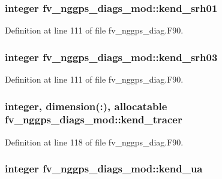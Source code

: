 \subsubsection[{kend\-\_\-srh01}]{\setlength{\rightskip}{0pt plus 5cm}integer fv\-\_\-nggps\-\_\-diags\-\_\-mod\-::kend\-\_\-srh01\hspace{0.3cm}{\ttfamily [private]}}\label{classfv__nggps__diags__mod_a78fcf7e103ecbbce2efb73cac3724aa1}


Definition at line 111 of file fv\-\_\-nggps\-\_\-diag.\-F90.

\subsubsection[{kend\-\_\-srh03}]{\setlength{\rightskip}{0pt plus 5cm}integer fv\-\_\-nggps\-\_\-diags\-\_\-mod\-::kend\-\_\-srh03\hspace{0.3cm}{\ttfamily [private]}}\label{classfv__nggps__diags__mod_a7ed4ac96d6427e52194a7b6068868d4f}


Definition at line 111 of file fv\-\_\-nggps\-\_\-diag.\-F90.

\subsubsection[{kend\-\_\-tracer}]{\setlength{\rightskip}{0pt plus 5cm}integer, dimension(\-:), allocatable fv\-\_\-nggps\-\_\-diags\-\_\-mod\-::kend\-\_\-tracer\hspace{0.3cm}{\ttfamily [private]}}\label{classfv__nggps__diags__mod_acf7563c97e50eba24a2800623db2c963}


Definition at line 118 of file fv\-\_\-nggps\-\_\-diag.\-F90.

\subsubsection[{kend\-\_\-ua}]{\setlength{\rightskip}{0pt plus 5cm}integer fv\-\_\-nggps\-\_\-diags\-\_\-mod\-::kend\-\_\-ua\hspace{0.3cm}{\ttfamily [private]}}\label{classfv__nggps__diags__mod_a678d21e583784e54c0957c1f2c429a14}


